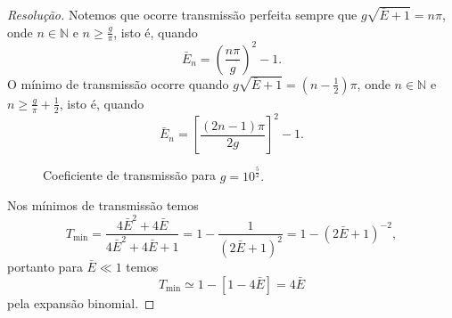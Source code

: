 \begin{proof}[Resolução]
    Notemos que ocorre transmissão perfeita sempre que \(g\sqrt{\bar{E} + 1} = n\pi\), onde \(n \in \mathbb{N}\) e \(n \geq \frac{g}{\pi}\), isto é, quando
    \begin{equation*}
        \bar{E}_n = \left(\frac{n\pi}{g}\right)^2 - 1.
    \end{equation*}
    O mínimo de transmissão ocorre quando \(g \sqrt{\bar{E} + 1} = (n - \frac{1}{2})\pi\), onde \(n \in \mathbb{N}\) e \(n \geq \frac{g}{\pi} + \frac12\), isto é, quando
    \begin{equation*}
        \bar{E}_n = \left[\frac{(2n - 1)\pi}{2g}\right]^2 - 1.
    \end{equation*}
    \begin{figure}[!ht]
        \centering
        \caption{Coeficiente de transmissão para \(g = 10^{\frac52}.\)}
    \end{figure}
    Nos mínimos de transmissão temos
    \begin{equation*}
        T_\mathrm{min} = \frac{4\bar{E}^2 + 4\bar{E}}{4\bar{E}^2 + 4\bar{E} + 1} = 1 - \frac{1}{(2\bar{E} + 1)^2} = 1 - (2\bar{E} + 1)^{-2},
    \end{equation*}
    portanto para \(\bar{E} \ll 1\) temos
    \begin{equation*}
        T_\mathrm{min} \simeq 1 - \left[1 - 4\bar{E}\right] = 4\bar{E}
    \end{equation*}
    pela expansão binomial.
\end{proof}
